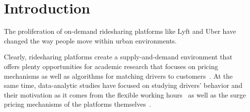 
\section{Introduction}
\label{sec:introduction}

The proliferation of on-demand ridesharing platforms like Lyft and Uber
have changed the way people move within urban environments. 


Clearly, ridesharing platforms create a supply-and-demand environment that offers 
plenty opportunities for academic research that focuses on pricing mechanisms
as well as algorithms for matching drivers to customers~\cite{}.
At the same time, data-analytic studies have focused
on studying drivers' behavior and their motivation as it comes from the flexible working 
hours~\cite{hall2016analysis} as well as the surge pricing mechanisms of the platforms themselves~\cite{chen2015peeking,chen2016dynamic}.
 